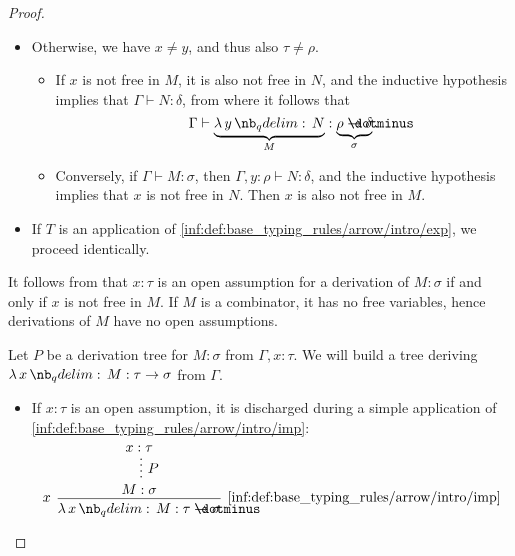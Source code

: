 \begin{proof}
\begin{itemize}
\begin{itemize}
      \item Otherwise, we have \( x \neq y \), and thus also \( \tau \neq \rho \).

      \begin{itemize}
        \item If \( x \) is not free in \( M \), it is also not free in \( N \), and the inductive hypothesis implies that \( \Gamma \vdash N: \delta \), from where it follows that
        \begin{equation*}
          \Gamma \vdash \underbrace{\qabs y N}_M: \underbrace{\rho \synimplies \delta}_\sigma.
        \end{equation*}

        \item Conversely, if \( \Gamma \vdash M: \sigma \), then \( \Gamma, y: \rho \vdash N: \delta \), and the inductive hypothesis implies that \( x \) is not free in \( N \). Then \( x \) is also not free in \( M \).
      \end{itemize}

      \item If \( T \) is an application of \ref{inf:def:base_typing_rules/arrow/intro/exp}, we proceed identically.
    \end{itemize}
  \end{itemize}

   It follows from  that \( x: \tau \) is an open assumption for a derivation of \( M: \sigma \) if and only if \( x \) is not free in \( M \). If \( M \) is a combinator, it has no free variables, hence derivations of \( M \) have no open assumptions.


  \SufficiencySubProof* Let \( P \) be a derivation tree for \( M: \sigma \) from \( \Gamma, x: \tau \). We will build a tree deriving \( \qabs x M: \tau \to \sigma \) from \( \Gamma \).

  \begin{itemize}
    \item If \( x: \tau \) is an open assumption, it is discharged during a simple application of \ref{inf:def:base_typing_rules/arrow/intro/imp}:
    \begin{equation*}
      \begin{prooftree}
        \hypo{ x: \tau }
        \ellipsis { \( P \) } { M: \sigma }
        \infer[left label=\( x \)]1[\ref{inf:def:base_typing_rules/arrow/intro/imp}]{ \qabs x M: \tau \synimplies \sigma }
      \end{prooftree}
    \end{equation*}


\end{itemize}
\end{proof}
